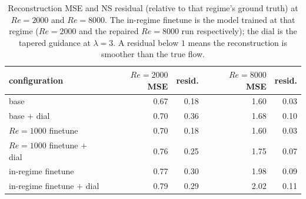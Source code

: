 \begin{table}[t]
  \centering
  \caption{Reconstruction MSE and NS residual (relative to that regime's ground truth) at $Re=2000$ and $Re=8000$. The in-regime finetune is the model trained at that regime ($Re{=}2000$ and the repaired $Re{=}8000$ run respectively); the dial is the tapered guidance at $\lambda=3$. A residual below $1$ means the reconstruction is smoother than the true flow.}
  \label{tab:mse-resid-2k8k}
  \begin{tabular}{lrrrr}
    \toprule
    configuration & $Re{=}2000$ MSE & resid. & $Re{=}8000$ MSE & resid. \\
    \midrule
    base & 0.67 & 0.18 & 1.60 & 0.03 \\
    base $+$ dial & 0.70 & 0.36 & 1.68 & 0.10 \\
    $Re{=}1000$ finetune & 0.70 & 0.18 & 1.60 & 0.03 \\
    $Re{=}1000$ finetune $+$ dial & 0.76 & 0.25 & 1.75 & 0.07 \\
    in-regime finetune & 0.77 & 0.30 & 1.98 & 0.09 \\
    in-regime finetune $+$ dial & 0.79 & 0.29 & 2.02 & 0.11 \\
    \bottomrule
  \end{tabular}
\end{table}
